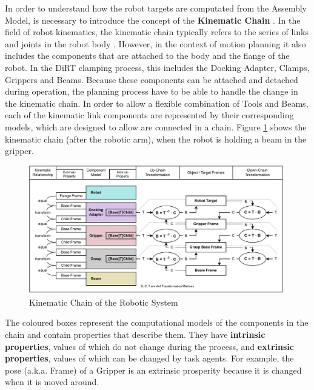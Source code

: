 In order to understand how the robot targets are computated from the Assembly Model, is necessary to introduce the concept of the \textbf{Kinematic Chain} \parencite{lavallePlanningAlgorithms2006}. In the field of robot kinematics, the kinematic chain typically refers to the series of links and joints in the robot body \parencite{waldronKinematics2016}. However, in the context of motion planning it also includes the components that are attached to the body and the flange of the robot. In the DiRT clamping process, this includes the Docking Adapter, Clamps, Grippers and Beams. Because these components can be attached and detached during operation, the planning process have to be able to handle the change in the kinematic chain. 
In order to allow a flexible combination of Tools and Beams, each of the kinematic link components are represented by their corresponding models, which are designed to allow are connected in a chain. Figure \ref{fig:kinematic-chain-of-the-robotic-system} shows the kinematic chain (after the robotic arm), when the robot is holding a beam in the gripper. 

\begin{figure}[!h]
    \centering
    \includegraphics[width=0.99\textwidth]{images/6a/robot-frame-propagation.pdf}
    \caption{Kinematic Chain of the Robotic System}
    \label{fig:kinematic-chain-of-the-robotic-system}
\end{figure}

The coloured boxes represent the computational models of the components in the chain and contain properties that describe them. They have \textbf{intrinsic properties}, values of which do not change during the process, and \textbf{extrinsic properties}, values of which can be changed by task agents. For example, the pose (a.k.a. Frame) of a Gripper is an extrinsic prosperity because it is changed when it is moved around. 

